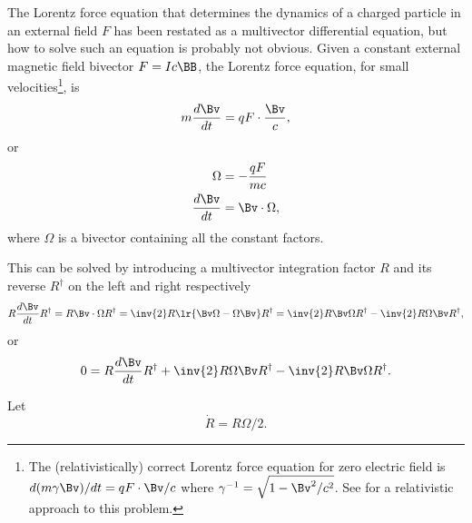 %
%

The Lorentz force equation that determines the dynamics of a charged particle in an external field \( F \) has been restated as a multivector differential equation, but how to solve such an equation is probably not obvious.
Given a constant external magnetic field bivector \( F = I c \BB \), the Lorentz force equation, for small velocities\footnote{The (relativistically) correct Lorentz force equation for zero electric field is \( d(m \gamma \Bv)/dt = q F \cdot \Bv/c \) where \( \gamma^{-1} = \sqrt{1 - \Bv^2/c^2}\).  See \citep{doran2003gap} for a relativistic approach to this problem.}, is
\begin{equation}\label{eqn:lorentzForce_constantMagnetic:60}
m \frac{d\Bv}{dt} = q F \cdot \frac{\Bv}{c},
\end{equation}
or
\begin{equation}\label{eqn:lorentzForce_constantMagnetic:80}
\begin{aligned}
\Omega &= -\frac{q F}{m c} \\
\frac{d\Bv}{dt} &= \Bv \cdot \Omega,
\end{aligned}
\end{equation}
where \( \Omega \) is a bivector containing all the constant factors.

This can be solved by introducing a multivector integration factor \( R \) and its reverse \( R^\dagger \) on the left and right respectively
\begin{dmath}\label{eqn:lorentzForce_constantMagnetic:100}
R \frac{d\Bv}{dt} R^\dagger
= R \Bv \cdot \Omega R^\dagger
= \inv{2} R \lr{ \Bv \Omega - \Omega \Bv} R^\dagger
= \inv{2} R \Bv \Omega R^\dagger - \inv{2} R \Omega \Bv R^\dagger,
\end{dmath}
or
\begin{dmath}\label{eqn:lorentzForce_constantMagnetic:120}
0 =
R \frac{d\Bv}{dt} R^\dagger
+ \inv{2} R \Omega \Bv R^\dagger
- \inv{2} R \Bv \Omega R^\dagger.
\end{dmath}

Let
\begin{equation}\label{eqn:lorentzForce_constantMagnetic:140}
\dot{R} = R \Omega/2.
\end{equation}

